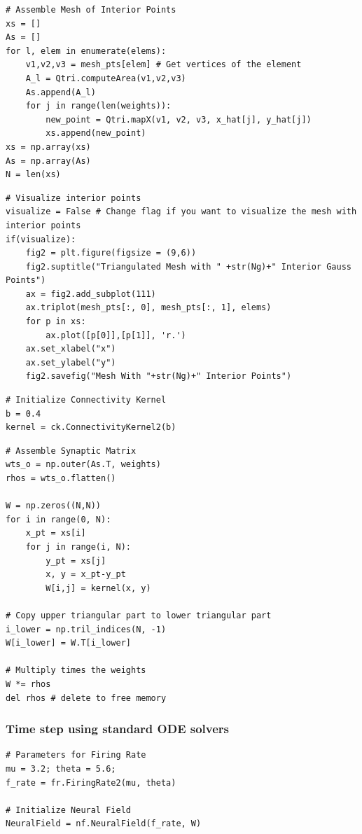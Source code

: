 \documentclass{uonmathreport}
\begin{document}
\begin{verbatim}
# Assemble Mesh of Interior Points
xs = []
As = []
for l, elem in enumerate(elems):
	v1,v2,v3 = mesh_pts[elem] # Get vertices of the element
	A_l = Qtri.computeArea(v1,v2,v3)
	As.append(A_l)
	for j in range(len(weights)):
		new_point = Qtri.mapX(v1, v2, v3, x_hat[j], y_hat[j])
		xs.append(new_point)
xs = np.array(xs)
As = np.array(As)
N = len(xs)
\end{verbatim}

\begin{verbatim}
# Visualize interior points
visualize = False # Change flag if you want to visualize the mesh with interior points
if(visualize):
	fig2 = plt.figure(figsize = (9,6))
	fig2.suptitle("Triangulated Mesh with " +str(Ng)+" Interior Gauss Points")
	ax = fig2.add_subplot(111)
	ax.triplot(mesh_pts[:, 0], mesh_pts[:, 1], elems)
	for p in xs:
		ax.plot([p[0]],[p[1]], 'r.')
	ax.set_xlabel("x")
	ax.set_ylabel("y")
	fig2.savefig("Mesh With "+str(Ng)+" Interior Points")
\end{verbatim}

\begin{verbatim}
# Initialize Connectivity Kernel
b = 0.4
kernel = ck.ConnectivityKernel2(b)
\end{verbatim}

\begin{verbatim}
# Assemble Synaptic Matrix
wts_o = np.outer(As.T, weights)
rhos = wts_o.flatten()

W = np.zeros((N,N))
for i in range(0, N):
	x_pt = xs[i]
	for j in range(i, N):
		y_pt = xs[j]
		x, y = x_pt-y_pt
		W[i,j] = kernel(x, y) 

# Copy upper triangular part to lower triangular part
i_lower = np.tril_indices(N, -1)
W[i_lower] = W.T[i_lower]

# Multiply times the weights
W *= rhos
del rhos # delete to free memory
\end{verbatim}

\subsubsection{Time step using standard ODE solvers}\label{time-step-using-standard-ode-solvers}

\begin{verbatim}
# Parameters for Firing Rate
mu = 3.2; theta = 5.6;
f_rate = fr.FiringRate2(mu, theta)

# Initialize Neural Field
NeuralField = nf.NeuralField(f_rate, W)
\end{verbatim}
\end{document}
